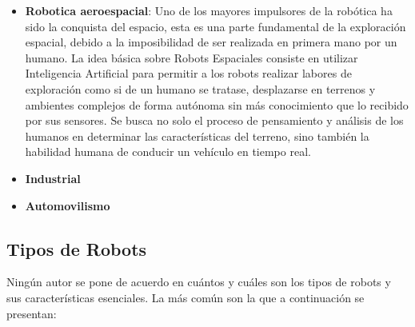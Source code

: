 \begin{itemize}
\item \textbf{Robotica aeroespacial}: Uno de los mayores impulsores de la robótica ha sido la conquista del espacio, esta es una parte fundamental de la exploración espacial, debido a la imposibilidad de ser realizada en primera mano por un humano.
La idea básica sobre Robots Espaciales consiste en utilizar Inteligencia Artificial para
permitir a los robots realizar labores de exploración como si de un humano se tratase, desplazarse en terrenos y ambientes complejos de forma autónoma sin más conocimiento que lo recibido por sus sensores. Se busca no solo el proceso de pensamiento y análisis de los humanos en determinar las características del terreno, sino también la habilidad humana de conducir un vehículo en tiempo real.

\item \textbf{Industrial}
\item \textbf{Automovilismo}
\end{itemize}

\subsection{Tipos de Robots}
\label{subsec:tipos de robots}

Ningún autor se pone de acuerdo en cuántos y cuáles son los tipos de robots y sus características esenciales. La más común son la que a continuación se presentan:

